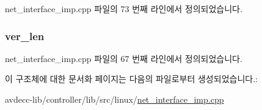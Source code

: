 net\+\_\+interface\+\_\+imp.\+cpp 파일의 73 번째 라인에서 정의되었습니다.

\subsubsection[{\texorpdfstring{ver\+\_\+len}{ver_len}}]{ ver\+\_\+len}\hypertarget{structavdecc__lib_1_1ipheader_a09e3733cb6c97f2ad341bbabee1ccf28}{}\label{structavdecc__lib_1_1ipheader_a09e3733cb6c97f2ad341bbabee1ccf28}


net\+\_\+interface\+\_\+imp.\+cpp 파일의 67 번째 라인에서 정의되었습니다.



이 구조체에 대한 문서화 페이지는 다음의 파일로부터 생성되었습니다.\+:\begin{DoxyCompactItemize}
\item 
avdecc-\/lib/controller/lib/src/linux/\hyperlink{linux_2net__interface__imp_8cpp}{net\+\_\+interface\+\_\+imp.\+cpp}\end{DoxyCompactItemize}
